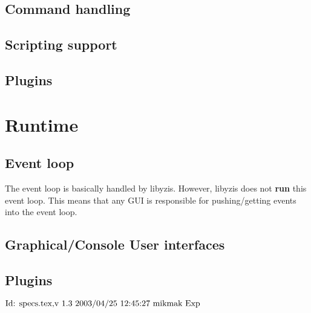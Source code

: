 \newpage
\subsection{Command handling}

\newpage
\subsection{Scripting support}

\newpage
\subsection{Plugins}


\newpage
\section{Runtime}
\subsection{Event loop}
The event loop is basically handled by libyzis. However, libyzis does not {\bf
run} this event loop. This means that any GUI is responsible for
pushing/getting events into the event loop.

\newpage
\subsection{Graphical/Console User interfaces}
\newpage
\subsection{Plugins}


\vfill
$ \version\ $
\eject


